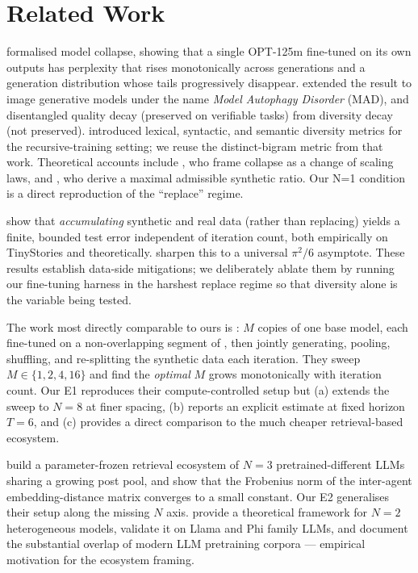 \section{Related Work}
\label{sec:related}

\citet{shumailov2024nature} formalised model collapse, showing that a
single OPT-125m fine-tuned on its own \wikitext outputs has perplexity
that rises monotonically across generations and a generation
distribution whose tails progressively disappear.
\citet{alemohammad2023mad} extended the result to image generative
models under the name \emph{Model Autophagy Disorder} (MAD), and
\citet{briesch2023suffer} disentangled quality decay (preserved on
verifiable tasks) from diversity decay (not preserved).
\citet{guo2023linguistic} introduced lexical, syntactic, and semantic
diversity metrics for the recursive-training setting; we reuse the
distinct-bigram metric from that work. Theoretical accounts include
\citet{dohmatob2024tale}, who frame collapse as a change of scaling laws,
and \citet{seddik2024synthetic}, who derive a maximal admissible
synthetic ratio. Our N=1 condition is a direct reproduction of the
\citet{shumailov2024nature} ``replace'' regime.

\citet{gerstgrasser2024accumulating} show that \emph{accumulating}
synthetic and real data (rather than replacing) yields a finite,
bounded test error independent of iteration count, both empirically
on TinyStories and theoretically. \citet{dey2024universality} sharpen
this to a universal $\pi^2/6$ asymptote. These results establish
data-side mitigations; we deliberately ablate them by running our
fine-tuning harness in the harshest replace regime so that diversity
alone is the variable being tested.

The work most directly comparable to ours is
\citet{hodel2026epistemic}: $M$ copies of one base model, each
fine-tuned on a non-overlapping segment of \wikitext, then jointly
generating, pooling, shuffling, and re-splitting the synthetic data
each iteration. They sweep $M \in \{1, 2, 4, 16\}$ and find the
\emph{optimal} $M$ grows monotonically with iteration count. Our E1
reproduces their compute-controlled setup but (a) extends the sweep
to $N{=}8$ at finer spacing, (b) reports an explicit \mvp estimate at
fixed horizon $T{=}6$, and (c) provides a direct comparison to the
much cheaper retrieval-based ecosystem.

\citet{wang2025web} build a parameter-frozen retrieval ecosystem of
$N{=}3$ pretrained-different LLMs sharing a growing post pool, and
show that the Frobenius norm of the inter-agent embedding-distance
matrix converges to a small constant. Our E2 generalises their setup
along the missing $N$ axis. \citet{vu2025recursive} provide a
theoretical framework for $N{=}2$ heterogeneous models, validate it
on Llama and Phi family LLMs, and document the substantial overlap of
modern LLM pretraining corpora --- empirical motivation for the
ecosystem framing.

